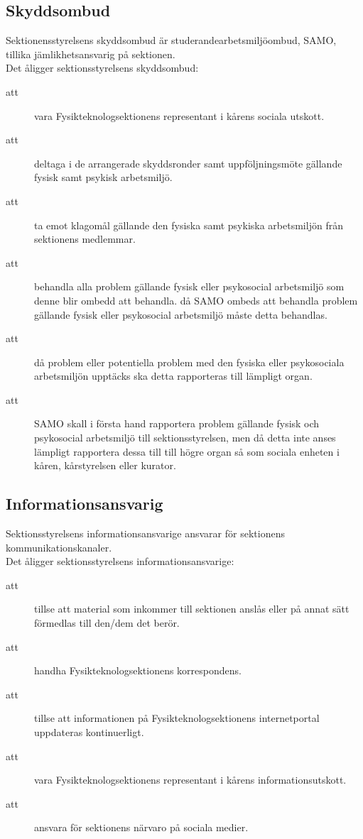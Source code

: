 \documentclass[a4paper]{article}
\begin{document}
\begin{foreningenv}{\forening{}}
    \subsection{Skyddsombud}
    Sektionensstyrelsens skyddsombud är studerandearbetsmiljöombud, SAMO, tillika jämlikhetsansvarig på sektionen.\\
    
    Det åligger sektionsstyrelsens skyddsombud:
    \begin{description}
        \item[att] vara Fysikteknologsektionens representant i kårens sociala utskott. 
        \item[att] deltaga i de arrangerade skyddsronder samt uppföljningsmöte gällande fysisk samt psykisk arbetsmiljö.
        \item[att] ta emot klagomål gällande den fysiska samt psykiska arbetsmiljön från sektionens medlemmar.
        \item[att] behandla alla problem gällande fysisk eller psykosocial arbetsmiljö som denne blir ombedd att behandla.
        då SAMO ombeds att behandla problem gällande fysisk eller psykosocial arbetsmiljö måste detta behandlas.
        \item[att] då problem eller potentiella problem med den fysiska eller psykosociala arbetsmiljön upptäcks ska detta rapporteras till lämpligt organ.
        \item[att] SAMO skall i första hand rapportera problem gällande fysisk och psykosocial arbetsmiljö till sektionsstyrelsen, men då detta inte anses lämpligt rapportera dessa till till högre organ så som sociala enheten i kåren, kårstyrelsen eller kurator.
    \end{description}
    
    \subsection{Informationsansvarig}
    Sektionsstyrelsens informationsansvarige ansvarar för sektionens kommunikationskanaler.\\
    
    Det åligger sektionsstyrelsens informationsansvarige:
    \begin{description}
        \item[att] tillse att material som inkommer till sektionen anslås eller på annat sätt förmedlas till den/dem det berör.
        \item[att] handha Fysikteknologsektionens korrespondens.
        \item[att] tillse att informationen på Fysikteknologsektionens internetportal uppdateras kontinuerligt.
        \item[att] vara Fysikteknologsektionens representant i kårens informationsutskott.
        \item[att] ansvara för sektionens närvaro på sociala medier.
    \end{description}
\end{foreningenv}
\end{document}
